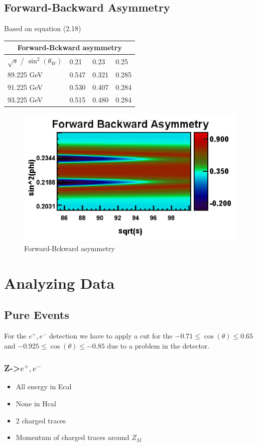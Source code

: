 \documentclass[]{article}
\begin{document}
\subsection{Forward-Backward Asymmetry}
Based on equation (2.18)
\begin{tabular}{ |p{3cm}||p{2cm}|p{2cm}|p{2cm}|  }
 \hline
 \multicolumn{4}{|c|}{Forward-Bckward asymmetry} \\
 \hline
 $\sqrt{s}$ / $\sin^2(\theta_W)$ & 0.21 & 0.23 & 0.25 \\
 \hline
   89.225 GeV & 0.547 & 0.321 & 0.285  \\
   91.225 GeV & 0.530 & 0.407 & 0.284  \\
   93.225 GeV & 0.515 & 0.480 & 0.284  \\
  \hline
\end{tabular}
\begin{figure}[H]
	\centering
	\includegraphics[scale=0.6]{forward_backward_symmetry}
	\caption{Forward-Bckward asymmetry}
	\label{fig:for-back-asy}
\end{figure}

\section{Analyzing Data}

\subsection{Pure Events}
For the $e^+, e^-$ detection we have to apply a cut for the $-0.71 \leq \cos(\theta) \leq 0.65$ and  $-0.925 \leq \cos(\theta) \leq -0.85$ due to a problem in the detector.
\newline

\subsubsection{Z->$e^+, e^-$}
\begin{itemize}  
\item All energy in Ecal
\item None in Hcal
\item 2 charged traces
\item Momentum of charged traces around $Z_M$
\end{itemize}
\end{document}
